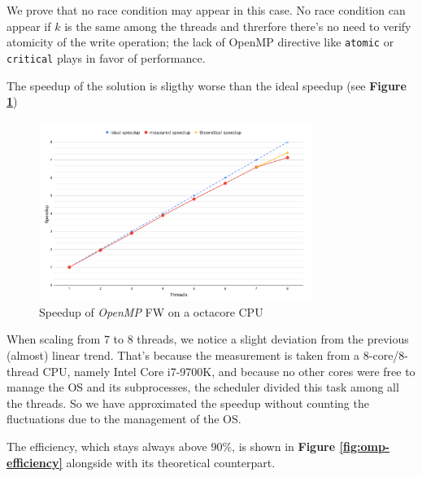 We prove that no race condition may appear in this case. 
No race condition can appear if $k$ is the same among the threads and threrfore there's no need to verify atomicity of the write operation;
the lack of OpenMP directive like \texttt{atomic} or \texttt{critical} plays in favor of performance. \par

The speedup of the solution is sligthy worse than the ideal speedup (see \textbf{Figure \ref*{fig:omp-speedup}})

\begin{figure}[h!]
\centering                                                                        
\includegraphics[width=3.5in]{diagrams/openmp-speedup}
\captionsetup{justification=centering,margin=2cm}                                                                                                                                   
\caption{Speedup of \emph{OpenMP} FW on a octacore CPU}                                                                                                                                            
\label{fig:omp-speedup}                                                                                                                                                           
\end{figure}
When scaling from 7 to 8 threads, we notice a slight deviation from the previous (almost) linear trend. That's because the measurement
is taken from a 8-core/8-thread CPU, namely Intel Core i7-9700K, and because no other cores were free to manage the OS and its subprocesses, the scheduler
divided this task among all the threads. So we have approximated the speedup without counting the fluctuations due to the management of the OS. \par

The efficiency, which stays always above $90\%$, is shown in \textbf{Figure \ref*{fig:omp-efficiency}} alongside with its theoretical counterpart.

